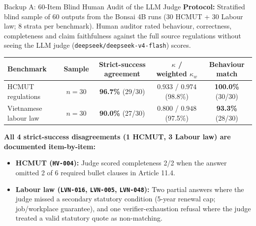 \documentclass[aspectratio=1610,11pt]{beamer}
\begin{document}
\begin{frame}{Backup A: 60-Item Blind Human Audit of the LLM Judge}
  \footnotesize
  \textbf{Protocol:} Stratified blind sample of 60 outputs from the Bonsai 4B runs (30 HCMUT + 30 Labour law; 8 strata per benchmark). Human auditor rated behaviour, correctness, completeness and claim faithfulness against the full source regulations without seeing the LLM judge (\texttt{deepseek/deepseek-v4-flash}) scores.
  \vspace{4pt}

  \centering
  {\scriptsize
  \begin{tabular}{@{}lcccc@{}}
    \toprule Benchmark & Sample & Strict-success agreement & $\kappa$ / weighted $\kappa_w$ & Behaviour match\\\midrule
    HCMUT regulations & $n=30$ & \textbf{96.7\%} (29/30) & $0.933$ / $0.974$ (98.8\%) & \textbf{100.0\%} (30/30)\\
    Vietnamese labour law & $n=30$ & \textbf{90.0\%} (27/30) & $0.800$ / $0.948$ (97.5\%) & \textbf{93.3\%} (28/30)\\
    \bottomrule
  \end{tabular}}
  \vspace{5pt}

  \raggedright
  \textbf{All 4 strict-success disagreements (1 HCMUT, 3 Labour law) are documented item-by-item:}
  \begin{itemize}
    \item \textbf{HCMUT (\texttt{HV-004}):} Judge scored completeness 2/2 when the answer omitted 2 of 6 required bullet clauses in Article 11.4.
    \item \textbf{Labour law (\texttt{LVN-016}, \texttt{LVN-005}, \texttt{LVN-048}):} Two partial answers where the judge missed a secondary statutory condition (5-year renewal cap; job/workplace guarantee), and one verifier-exhaustion refusal where the judge treated a valid statutory quote as non-matching.
  \end{itemize}
\end{frame}
\end{document}
